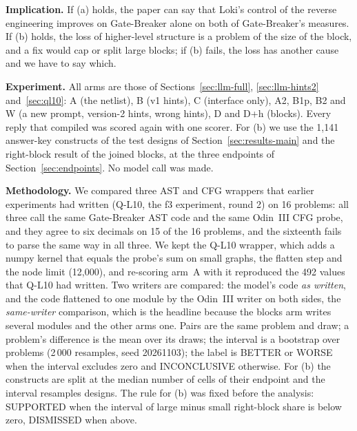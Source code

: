 \documentclass[conference]{IEEEtran}
\newcommand{\hev}[1]{\par\smallskip\noindent\textbf{#1}}
\begin{document}
\hev{Implication.} If (a) holds, the paper can say that Loki's control of the reverse engineering improves on Gate-Breaker alone on both of Gate-Breaker's measures. If (b) holds, the loss of higher-level structure is a problem of the size of the block, and a fix would cap or split large blocks; if (b) fails, the loss has another cause and we have to say which.

\hev{Experiment.} All arms are those of Sections~\ref{sec:llm-full}, \ref{sec:llm-hints2} and~\ref{sec:ql10}: A (the netlist), B (v1 hints), C (interface only), A2, B1p, B2 and W (a new prompt, version-2 hints, wrong hints), D and D+h (blocks). Every reply that compiled was scored again with one scorer. For (b) we use the 1,141 answer-key constructs of the test designs of Section~\ref{sec:results-main} and the right-block result of the joined blocks, at the three endpoints of Section~\ref{sec:endpoints}. No model call was made.

\hev{Methodology.} We compared three AST and CFG wrappers that earlier experiments had written (Q-L10, the f3 experiment, round 2) on 16 problems: all three call the same Gate-Breaker AST code and the same Odin~III CFG probe, and they agree to six decimals on 15 of the 16 problems, and the sixteenth fails to parse the same way in all three. We kept the Q-L10 wrapper, which adds a numpy kernel that equals the probe's sum on small graphs, the flatten step and the node limit (12,000), and re-scoring arm~A with it reproduced the 492 values that Q-L10 had written. Two writers are compared: the model's code \emph{as written}, and the code flattened to one module by the Odin~III writer on both sides, the \emph{same-writer} comparison, which is the headline because the blocks arm writes several modules and the other arms one. Pairs are the same problem and draw; a problem's difference is the mean over its draws; the interval is a bootstrap over problems (2\,000 resamples, seed 20261103); the label is BETTER or WORSE when the interval excludes zero and INCONCLUSIVE otherwise. For (b) the constructs are split at the median number of cells of their endpoint and the interval resamples designs. The rule for (b) was fixed before the analysis: SUPPORTED when the interval of large minus small right-block share is below zero, DISMISSED when above.
\end{document}
